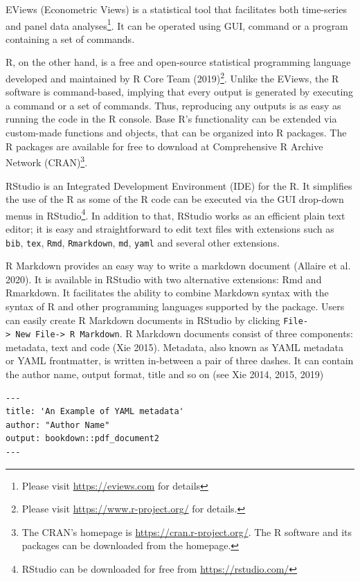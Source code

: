 EViews (Econometric Views) is a statistical tool that facilitates both time-series and panel data analyses\footnote{Please visit \url{https://eviews.com} for details}. It can be operated using GUI, command or a program containing a set of commands.

R, on the other hand, is a free and open-source statistical programming language developed and maintained by R Core Team (2019)\footnote{Please visit \url{https://www.r-project.org/} for details.}. Unlike the EViews, the R software is command-based, implying that every output is generated by executing a command or a set of commands. Thus, reproducing any outputs is as easy as running the code in the R console. Base R's functionality can be extended via custom-made functions and objects, that can be organized into R packages. The R packages are available for free to download at Comprehensive R Archive Network (CRAN)\footnote{The CRAN's homepage is \url{https://cran.r-project.org/}. The R software and its packages can be downloaded from the homepage.}.

RStudio is an Integrated Development Environment (IDE) for the R. It simplifies the use of the R as some of the R code can be executed via the GUI drop-down menus in RStudio\footnote{RStudio can be downloaded for free from \url{https://rstudio.com/}}. In addition to that, RStudio works as an efficient plain text editor; it is easy and straightforward to edit text files with extensions such as \texttt{bib}, \texttt{tex}, \texttt{Rmd}, \texttt{Rmarkdown}, \texttt{md}, \texttt{yaml} and several other extensions.

R Markdown provides an easy way to write a markdown document (Allaire et al. 2020). It is available in RStudio with two alternative extensions: Rmd and Rmarkdown. It facilitates the ability to combine Markdown syntax with the syntax of R and other programming languages supported by the  package. Users can easily create R Markdown documents in RStudio by clicking \texttt{File-\textgreater{}\ New\ File-\textgreater{}\ R\ Markdown}. R Markdown documents consist of three components: metadata, text and code (Xie 2015). Metadata, also known as YAML metadata or YAML frontmatter, is written in-between a pair of three dashes. It can contain the author name, output format, title and so on (see Xie 2014, 2015, 2019)

\begin{verbatim}
---
title: 'An Example of YAML metadata'
author: "Author Name"
output: bookdown::pdf_document2
---
\end{verbatim}

